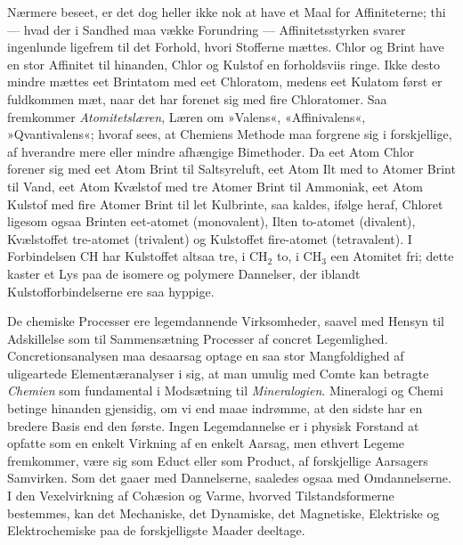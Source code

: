 \documentclass[12pt]{book}
\newcommand{\apage}[1]{\marginnote{\footnotesize\textit{[#1]}}}
\begin{document}
Nærmere beseet, er det dog heller ikke nok at have et Maal for
Affiniteterne; thi --- hvad der i Sandhed maa vække Forundring --- Affinitetsstyrken
svarer ingenlunde ligefrem til det Forhold, hvori Stofferne mættes. Chlor
og Brint have en stor Affinitet til hinanden, Chlor og Kulstof en
forholdsviis ringe. Ikke desto mindre mættes eet Brintatom med eet
Chloratom, medens eet Kulatom først er fuldkommen mæt, naar det har forenet
sig med fire Chloratomer. Saa  \apage{155} fremkommer \emph{Atomitetslæren}, Læren om »Valens«,
«Affinivalens«, »Qvantivalens«; hvoraf sees, at Chemiens Methode maa
forgrene sig i forskjellige, af hverandre mere eller mindre afhængige
Bimethoder. Da eet Atom Chlor forener sig med eet Atom Brint til
Saltsyreluft, eet Atom Ilt med to Atomer Brint til Vand, eet Atom Kvælstof
med tre Atomer Brint til Ammoniak, eet Atom Kulstof med fire Atomer Brint
til let Kulbrinte, saa kaldes, ifølge heraf, Chloret ligesom ogsaa Brinten
eet-atomet (monovalent), Ilten to-atomet (divalent), Kvælstoffet tre-atomet
(trivalent) og Kulstoffet fire-atomet (tetravalent). I Forbindelsen
$\mathrm{CH}$ har Kulstoffet altsaa tre, i $\mathrm{CH_2}$ to, i
$\mathrm{CH_3}$ een Atomitet fri; dette kaster et Lys paa de isomere og
polymere Dannelser, der iblandt Kulstofforbindelserne ere saa hyppige.

De chemiske Processer ere legemdannende Virksomheder, saavel med Hensyn
til Adskillelse som til Sammensætning Processer af concret Legemlighed.
Concretionsanalysen maa desaarsag optage en saa stor Mangfoldighed af
uligeartede Elementæranalyser i sig, at man umulig med Comte kan betragte
\emph{Chemien} som fundamental i Modsætning til \emph{Mineralogien}. Mineralogi og Chemi
betinge hinanden gjensidig, om vi end maae indrømme, at den sidste har en
bredere Basis end den første. Ingen Legemdannelse er i physisk Forstand at
opfatte som en enkelt Virkning af en enkelt Aarsag, men ethvert Legeme
fremkommer, være sig som Educt eller som Product, af forskjellige
Aarsagers Samvirken. Som det gaaer med Dannelserne, \apage{156} saaledes ogsaa med
Omdannelserne. I den Vexelvirkning af Cohæsion og Varme, hvorved
Tilstandsformerne bestemmes, kan det Mechaniske, det Dynamiske, det
Magnetiske, Elektriske og Elektrochemiske paa de forskjelligste Maader
deeltage.
\end{document}
